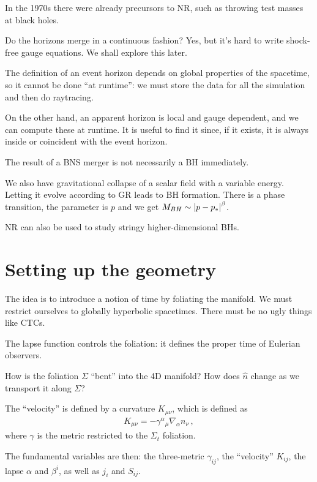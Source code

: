 \documentclass[main.tex]{subfiles}
\begin{document}
In the 1970s there were already precursors to NR, such as throwing test masses at black holes. 

Do the horizons merge in a continuous fashion?
Yes, but it's hard to write shock-free gauge equations. We shall explore this later.

The definition of an event horizon depends on global properties of the spacetime, so it cannot be done ``at runtime'': we must store the data for all the simulation and then do raytracing. 

On the other hand, an apparent horizon is local and gauge dependent, and we can compute these at runtime. It is useful to find it since, if it exists, it is always inside or coincident with the event horizon. 

The result of a BNS merger is not necessarily a BH immediately. 

We also have gravitational collapse of a scalar field with a variable energy. Letting it evolve according to GR leads to BH formation. 
There is a phase transition, the parameter is \(p\) and we get \(M_{BH}\sim \abs{p - p_*}^{\beta }\). 


NR can also be used to study stringy higher-dimensional BHs. 

\section{Setting up the geometry}

The idea is to introduce a notion of time by foliating the manifold. 
We must restrict ourselves to globally hyperbolic spacetimes. 
There must be no ugly things like CTCs. 

The lapse function controls the foliation: it defines the proper time of Eulerian observers. 

How is the foliation \(\Sigma \) ``bent'' into the 4D manifold? How does \(\hat{n}\) change as we transport it along \(\Sigma \)? 

The ``velocity'' is defined by a curvature \(K_{\mu \nu }\), which is defined as 
%
\begin{align}
K_{\mu \nu } = - \gamma^{\alpha }{}_{\mu } \nabla_{\alpha } n_\nu 
\,,
\end{align}
%
where \(\gamma \) is the metric restricted to the \(\Sigma _t\) foliation. 

The fundamental variables are then: the three-metric \(\gamma_{ij}\), the ``velocity'' \(K_{ij}\), the lapse \(\alpha \) and \(\beta^{i}\), as well as \(j_i\) and \(S_{ij}\). 
\end{document}
